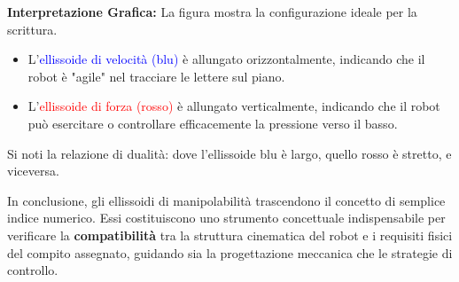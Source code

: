 ﻿\documentclass[11pt, a4paper]{article}
\begin{document}
\vspace{0.5cm}

\noindent
\begin{minipage}[c]{0.38\textwidth}
    \centering
\end{minipage}
\hfill
\begin{minipage}[c]{0.58\textwidth}
    \textbf{Interpretazione Grafica:}
    La figura mostra la configurazione ideale per la scrittura.
    \begin{itemize}
        \item L'\textcolor{blue}{ellissoide di velocità (blu)} è allungato orizzontalmente, indicando che il robot è "agile" nel tracciare le lettere sul piano.
        \item L'\textcolor{red}{ellissoide di forza (rosso)} è allungato verticalmente, indicando che il robot può esercitare o controllare efficacemente la pressione verso il basso.
    \end{itemize}
    Si noti la relazione di dualità: dove l'ellissoide blu è largo, quello rosso è stretto, e viceversa.
\end{minipage}

\vspace{0.5cm}

In conclusione, gli ellissoidi di manipolabilità trascendono il concetto di semplice indice numerico. Essi costituiscono uno strumento concettuale indispensabile per verificare la \textbf{compatibilità} tra la struttura cinematica del robot e i requisiti fisici del compito assegnato, guidando sia la progettazione meccanica che le strategie di controllo.
\end{document}
